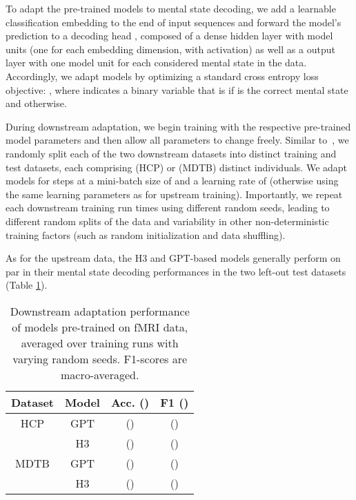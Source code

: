 \documentclass{article}
\begin{document}
To adapt the pre-trained models to mental state decoding, we add a learnable classification embedding  to the end of input sequences  and forward the model's prediction  to a decoding head , composed of a dense hidden layer with  model units (one for each embedding dimension, with  activation) as well as a  output layer with one model unit  for each considered mental state in the data. Accordingly, we adapt models by optimizing a standard cross entropy loss objective: , where  indicates a binary variable that is  if  is the correct mental state and  otherwise.

During downstream adaptation, we begin training with the respective pre-trained model parameters and then allow all parameters to change freely. Similar to~\citep{thomas_fmri_2022}, we randomly split each of the two downstream datasets into distinct training and test datasets, each comprising  (HCP) or  (MDTB) distinct individuals. We adapt models for  steps at a mini-batch size of  and a learning rate of  (otherwise using the same learning parameters as for upstream training). Importantly, we repeat each downstream training run  times using different random seeds, leading to different random splits of the data and variability in other non-deterministic training factors (such as random initialization and data shuffling).

As for the upstream data, the H3 and GPT-based models generally perform on par in their mental state decoding performances in the two left-out test datasets (Table \ref{table:fmri-downstream}).

\begin{table}[h]
\small
    \centering
\caption{\label{table:fmri-downstream} Downstream adaptation performance of models pre-trained on fMRI data, averaged over  training runs with varying random seeds. F1-scores are macro-averaged.}
{
        \begin{tabular}{@{}|c|c|cc|@{}}
\hline
        Dataset & Model & Acc. () & F1 ()\\ \hline
        HCP & GPT &  () &  () \\
         & H3 &  () &  () \\ \hline
        MDTB & GPT &  () &  () \\
         & H3 &  () &  () \\ \hline
        \end{tabular}
    }
\end{table}  
\end{document}
